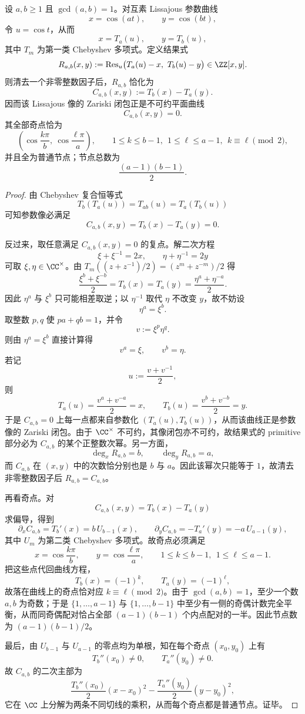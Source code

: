 \begin{theorem}\label{thm:derived-coprime-lissajous-chebyshev-elimination-nodes}
设 \(a,b\ge 1\) 且 \(\gcd(a,b)=1\)。对互素 Lissajous 参数曲线
\[
x=\cos(at),
\qquad
y=\cos(bt),
\]
令 \(u=\cos t\)，从而
\[
x=T_a(u),
\qquad
y=T_b(u),
\]
其中 \(T_m\) 为第一类 Chebyshev 多项式。定义结果式
\[
R_{a,b}(x,y):=\operatorname{Res}_{u}\bigl(T_a(u)-x,\ T_b(u)-y\bigr)\in\ZZ[x,y].
\]
则清去一个非零整数因子后，\(R_{a,b}\) 恰化为
\[
C_{a,b}(x,y):=T_b(x)-T_a(y).
\]
因而该 Lissajous 像的 Zariski 闭包正是不可约平面曲线
\[
C_{a,b}(x,y)=0.
\]
其全部奇点恰为
\[
\left(\cos\frac{k\pi}{b},\ \cos\frac{\ell\pi}{a}\right),
\qquad
1\le k\le b-1,\ \ 1\le \ell\le a-1,\ \ k\equiv \ell\pmod 2,
\]
并且全为普通节点；节点总数为
\[
\frac{(a-1)(b-1)}{2}.
\]
\end{theorem}
\begin{proof}
由 Chebyshev 复合恒等式
\[
T_b(T_a(u))=T_{ab}(u)=T_a(T_b(u))
\]
可知参数像必满足
\[
C_{a,b}(x,y)=T_b(x)-T_a(y)=0.
\]

反过来，取任意满足 \(C_{a,b}(x,y)=0\) 的复点。解二次方程
\[
\xi+\xi^{-1}=2x,
\qquad
\eta+\eta^{-1}=2y
\]
可取 \(\xi,\eta\in\CC^\times\)。由 \(T_m((z+z^{-1})/2)=(z^m+z^{-m})/2\) 得
\[
\frac{\xi^b+\xi^{-b}}{2}=T_b(x)=T_a(y)=\frac{\eta^a+\eta^{-a}}{2}.
\]
因此 \(\eta^a\) 与 \(\xi^b\) 只可能相差取逆；以 \(\eta^{-1}\) 取代 \(\eta\) 不改变 \(y\)，故不妨设
\[
\eta^a=\xi^b.
\]
取整数 \(p,q\) 使 \(pa+qb=1\)，并令
\[
v:=\xi^p\eta^q.
\]
则由 \(\eta^a=\xi^b\) 直接计算得
\[
v^a=\xi,
\qquad
v^b=\eta.
\]
若记
\[
u:=\frac{v+v^{-1}}{2},
\]
则
\[
T_a(u)=\frac{v^a+v^{-a}}{2}=x,
\qquad
T_b(u)=\frac{v^b+v^{-b}}{2}=y.
\]
于是 \(C_{a,b}=0\) 上每一点都来自参数化 \((T_a(u),T_b(u))\)，从而该曲线正是参数像的 Zariski 闭包。由于 \(\CC^\times\) 不可约，其像闭包亦不可约，故结果式的 primitive 部分必为 \(C_{a,b}\) 的某个正整数次幂。另一方面，
\[
\deg_x R_{a,b}=b,
\qquad
\deg_y R_{a,b}=a,
\]
而 \(C_{a,b}\) 在 \((x,y)\) 中的次数恰分别也是 \(b\) 与 \(a\)。因此该幂次只能等于 \(1\)，故清去非零整数因子后 \(R_{a,b}=C_{a,b}\)。

再看奇点。对
\[
C_{a,b}(x,y)=T_b(x)-T_a(y)
\]
求偏导，得到
\[
\partial_x C_{a,b}=T_b'(x)=b\,U_{b-1}(x),
\qquad
\partial_y C_{a,b}=-T_a'(y)=-a\,U_{a-1}(y),
\]
其中 \(U_m\) 为第二类 Chebyshev 多项式。故奇点必须满足
\[
x=\cos\frac{k\pi}{b},
\qquad
y=\cos\frac{\ell\pi}{a},
\qquad
1\le k\le b-1,\ \ 1\le \ell\le a-1.
\]
把这些点代回曲线方程，
\[
T_b(x)=(-1)^k,
\qquad
T_a(y)=(-1)^\ell,
\]
故落在曲线上的奇点恰对应 \(k\equiv \ell\pmod 2\)。由于 \(\gcd(a,b)=1\)，至少一个数 \(a,b\) 为奇数；于是 \(\{1,\dots,a-1\}\) 与 \(\{1,\dots,b-1\}\) 中至少有一侧的奇偶计数完全平衡，从而同奇偶配对恰占全部 \((a-1)(b-1)\) 个内点配对的一半。因此节点数为 \((a-1)(b-1)/2\)。

最后，由 \(U_{b-1}\) 与 \(U_{a-1}\) 的零点均为单根，知在每个奇点 \((x_0,y_0)\) 上有
\[
T_b''(x_0)\neq 0,
\qquad
T_a''(y_0)\neq 0.
\]
故 \(C_{a,b}\) 的二次主部为
\[
\frac{T_b''(x_0)}{2}(x-x_0)^2-\frac{T_a''(y_0)}{2}(y-y_0)^2,
\]
它在 \(\CC\) 上分解为两条不同切线的乘积，从而每个奇点都是普通节点。证毕。
\end{proof}

